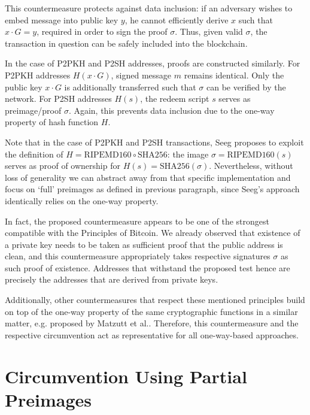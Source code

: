 \documentclass[a4paper,11pt,titlepage]{scrbook}
\begin{document}
This countermeasure protects against data inclusion: if an adversary wishes to embed message into public key $y$, he cannot efficiently derive $x$ such that $x\cdot G = y$, required in order to sign the proof $\sigma$.
Thus, given valid $\sigma$, the transaction in question can be safely included into the blockchain.

In the case of P2PKH and P2SH addresses, proofs are constructed similarly.
For P2PKH addresses $H(x\cdot G)$, signed message $m$ remains identical.
Only the public key $x\cdot G$ is additionally transferred such that $\sigma$ can be verified by the network.
For P2SH addresses $H(s)$, the redeem script $s$ serves as preimage/proof $\sigma$.
Again, this prevents data inclusion due to the one-way property of hash function $H$.

Note that in the case of P2PKH and P2SH transactions, Seeg proposes to exploit the definition of $H=\mathrm{RIPEMD160}\circ\mathrm{SHA256}$: the image $\sigma = \mathrm{RIPEMD160}(s)$ serves as proof of ownership for $H(s)=\mathrm{SHA256}(\sigma)$.
Nevertheless, without loss of generality we can abstract away from that specific implementation and focus on \enquote*{full} preimages as defined in previous paragraph, since Seeg's approach identically relies on the one-way property.

In fact, the proposed countermeasure appears to be one of the strongest compatible with the Principles of Bitcoin.
We already observed that existence of a private key needs to be taken as sufficient proof that the public address is clean,
and this countermeasure appropriately takes respective signatures $\sigma$ as such proof of existence.
Addresses that withstand the proposed test hence are precisely the addresses that are derived from private keys.

Additionally, other countermeasures that respect these mentioned principles build on top of the one-way property of the same cryptographic functions in a similar matter, e.g.\@ {} proposed by Matzutt et al.\@ \cite[Sec.~IV.D]{matzutt_thwarting_2018}.
Therefore, this countermeasure and the respective circumvention act as representative for all one-way-based approaches.

\section{Circumvention Using Partial Preimages}\label{sec:circumvention}
\end{document}

